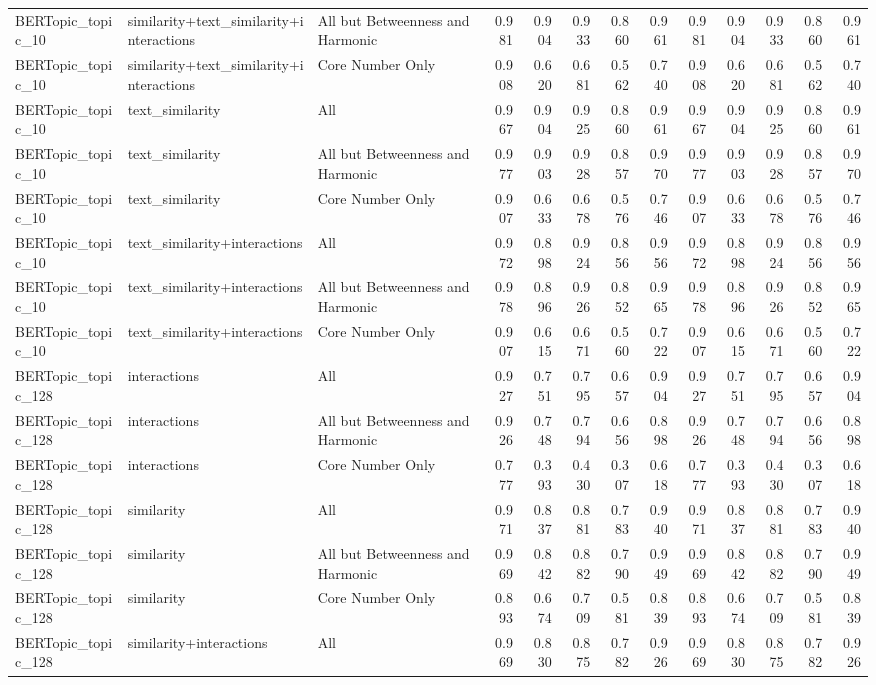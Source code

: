 \begin{tabular}{lllrrrrrrrrrr}
BERTopic_topic_10 & similarity+text_similarity+interactions & All but Betweenness and Harmonic & 0.981 & 0.904 & 0.933 & 0.860 & 0.961 & 0.981 & 0.904 & 0.933 & 0.860 & 0.961 \\
BERTopic_topic_10 & similarity+text_similarity+interactions & Core Number Only & 0.908 & 0.620 & 0.681 & 0.562 & 0.740 & 0.908 & 0.620 & 0.681 & 0.562 & 0.740 \\
BERTopic_topic_10 & text_similarity & All & 0.967 & 0.904 & 0.925 & 0.860 & 0.961 & 0.967 & 0.904 & 0.925 & 0.860 & 0.961 \\
BERTopic_topic_10 & text_similarity & All but Betweenness and Harmonic & 0.977 & 0.903 & 0.928 & 0.857 & 0.970 & 0.977 & 0.903 & 0.928 & 0.857 & 0.970 \\
BERTopic_topic_10 & text_similarity & Core Number Only & 0.907 & 0.633 & 0.678 & 0.576 & 0.746 & 0.907 & 0.633 & 0.678 & 0.576 & 0.746 \\
BERTopic_topic_10 & text_similarity+interactions & All & 0.972 & 0.898 & 0.924 & 0.856 & 0.956 & 0.972 & 0.898 & 0.924 & 0.856 & 0.956 \\
BERTopic_topic_10 & text_similarity+interactions & All but Betweenness and Harmonic & 0.978 & 0.896 & 0.926 & 0.852 & 0.965 & 0.978 & 0.896 & 0.926 & 0.852 & 0.965 \\
BERTopic_topic_10 & text_similarity+interactions & Core Number Only & 0.907 & 0.615 & 0.671 & 0.560 & 0.722 & 0.907 & 0.615 & 0.671 & 0.560 & 0.722 \\
BERTopic_topic_128 & interactions & All & 0.927 & 0.751 & 0.795 & 0.657 & 0.904 & 0.927 & 0.751 & 0.795 & 0.657 & 0.904 \\
BERTopic_topic_128 & interactions & All but Betweenness and Harmonic & 0.926 & 0.748 & 0.794 & 0.656 & 0.898 & 0.926 & 0.748 & 0.794 & 0.656 & 0.898 \\
BERTopic_topic_128 & interactions & Core Number Only & 0.777 & 0.393 & 0.430 & 0.307 & 0.618 & 0.777 & 0.393 & 0.430 & 0.307 & 0.618 \\
BERTopic_topic_128 & similarity & All & 0.971 & 0.837 & 0.881 & 0.783 & 0.940 & 0.971 & 0.837 & 0.881 & 0.783 & 0.940 \\
BERTopic_topic_128 & similarity & All but Betweenness and Harmonic & 0.969 & 0.842 & 0.882 & 0.790 & 0.949 & 0.969 & 0.842 & 0.882 & 0.790 & 0.949 \\
BERTopic_topic_128 & similarity & Core Number Only & 0.893 & 0.674 & 0.709 & 0.581 & 0.839 & 0.893 & 0.674 & 0.709 & 0.581 & 0.839 \\
BERTopic_topic_128 & similarity+interactions & All & 0.969 & 0.830 & 0.875 & 0.782 & 0.926 & 0.969 & 0.830 & 0.875 & 0.782 & 0.926 \\

\end{tabular}
